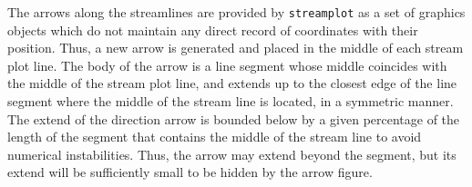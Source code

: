 \documentclass[english, a4paper]{article}
\begin{document}
The arrows along the streamlines are provided by \texttt{streamplot} as a set of graphics objects which do not maintain any direct record of coordinates with their position. Thus, a new arrow is generated and placed in the middle of each stream plot line. The body of the arrow is a line segment whose middle coincides with the middle of the stream plot line, and extends up to the closest edge of the line segment where the middle of the stream line is located, in a symmetric manner. The extend of the direction arrow is bounded below by a given percentage of the length of the segment that contains  the middle of the stream line to avoid numerical instabilities. Thus, the arrow may extend beyond the segment, but its extend will be sufficiently small to be hidden by the arrow figure.

\printbibliography[title={References}] %
%
%



%

\end{document}
